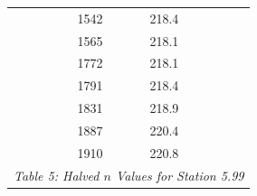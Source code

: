 \begin{center}
\begin{tabular}{|cc||cc||cc|}
             &                          & 1542 & 218.4                         &          &                                    \\
             &                          & 1565 & 218.1                         &          &                                    \\
             &                          & 1772 & 218.1                         &          &                                    \\
             &                          & 1791 & 218.4                         &          &                                    \\
             &                          & 1831 & 218.9                         &          &                                    \\
             &                          & 1887 & 220.4                         &          &                                    \\
             &                          & 1910 & 220.8                         &          &                                    \\
    \hline\multicolumn{6}{c}{\emph{Table 5: Halved $n$ Values for Station 5.99}}
\end{tabular}



\end{center}
